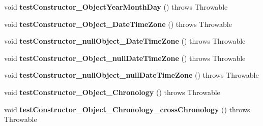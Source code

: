 \begin{DoxyCompactItemize}
\item 
\hypertarget{classorg_1_1joda_1_1time_1_1_test_local_date___constructors_a14538bbc34315293369f5741da999692}{void {\bfseries test\-Constructor\-\_\-\-Object\-Year\-Month\-Day} ()  throws Throwable }\label{classorg_1_1joda_1_1time_1_1_test_local_date___constructors_a14538bbc34315293369f5741da999692}

\item 
\hypertarget{classorg_1_1joda_1_1time_1_1_test_local_date___constructors_a568958c4500cc33eda06ab7b42bcc8ba}{void {\bfseries test\-Constructor\-\_\-\-Object\-\_\-\-Date\-Time\-Zone} ()  throws Throwable }\label{classorg_1_1joda_1_1time_1_1_test_local_date___constructors_a568958c4500cc33eda06ab7b42bcc8ba}

\item 
\hypertarget{classorg_1_1joda_1_1time_1_1_test_local_date___constructors_a6ce687f9c936e4458517b1a95a498a9c}{void {\bfseries test\-Constructor\-\_\-null\-Object\-\_\-\-Date\-Time\-Zone} ()  throws Throwable }\label{classorg_1_1joda_1_1time_1_1_test_local_date___constructors_a6ce687f9c936e4458517b1a95a498a9c}

\item 
\hypertarget{classorg_1_1joda_1_1time_1_1_test_local_date___constructors_a5ebd915d591e23e8707e5ad1cf975edd}{void {\bfseries test\-Constructor\-\_\-\-Object\-\_\-null\-Date\-Time\-Zone} ()  throws Throwable }\label{classorg_1_1joda_1_1time_1_1_test_local_date___constructors_a5ebd915d591e23e8707e5ad1cf975edd}

\item 
\hypertarget{classorg_1_1joda_1_1time_1_1_test_local_date___constructors_a5280309f3df9de4644a0e003c5b8136d}{void {\bfseries test\-Constructor\-\_\-null\-Object\-\_\-null\-Date\-Time\-Zone} ()  throws Throwable }\label{classorg_1_1joda_1_1time_1_1_test_local_date___constructors_a5280309f3df9de4644a0e003c5b8136d}

\item 
\hypertarget{classorg_1_1joda_1_1time_1_1_test_local_date___constructors_acc95558f6da07aa8b87cfbad576a10cc}{void {\bfseries test\-Constructor\-\_\-\-Object\-\_\-\-Chronology} ()  throws Throwable }\label{classorg_1_1joda_1_1time_1_1_test_local_date___constructors_acc95558f6da07aa8b87cfbad576a10cc}

\item 
\hypertarget{classorg_1_1joda_1_1time_1_1_test_local_date___constructors_a9528a90e9b3d0303b9e9389fc19bd334}{void {\bfseries test\-Constructor\-\_\-\-Object\-\_\-\-Chronology\-\_\-cross\-Chronology} ()  throws Throwable }\label{classorg_1_1joda_1_1time_1_1_test_local_date___constructors_a9528a90e9b3d0303b9e9389fc19bd334}


\end{DoxyCompactItemize}
